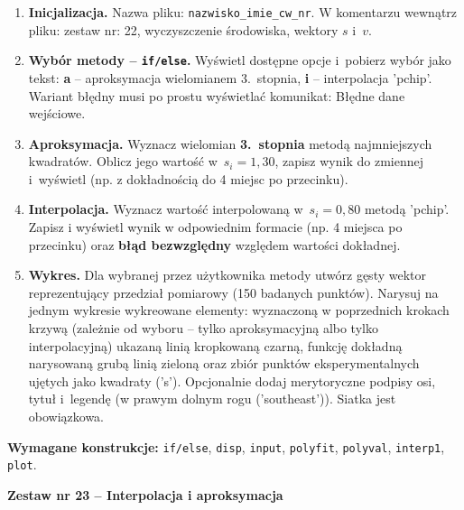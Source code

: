 \documentclass[a4paper,11pt]{article}
\begin{document}
\begin{enumerate}[leftmargin=*, label=\textbf{\arabic*.}, itemsep=2pt]

  \item \textbf{Inicjalizacja.}
    Nazwa pliku: \texttt{nazwisko\_imie\_cw\_nr}. W komentarzu wewnątrz pliku: zestaw nr: 22, wyczyszczenie środowiska, wektory $s$ i~$v$.

  \item \textbf{Wybór metody -- \texttt{if/else}.}
    Wyświetl dostępne opcje i~pobierz wybór jako tekst: \textbf{a} -- aproksymacja wielomianem 3.~stopnia, \textbf{i} -- interpolacja 'pchip'. Wariant błędny musi po prostu wyświetlać komunikat: Błędne dane wejściowe.

  \item \textbf{Aproksymacja.}
    Wyznacz wielomian \textbf{3.~stopnia} metodą najmniejszych kwadratów. Oblicz jego wartość w~$s_i = 1{,}30$, zapisz wynik do zmiennej i~wyświetl (np. z dokładnością do 4 miejsc po przecinku).

  \item \textbf{Interpolacja.}
    Wyznacz wartość interpolowaną w~$s_i = 0{,}80$ metodą 'pchip'. Zapisz i wyświetl wynik w odpowiednim formacie (np. 4 miejsca po przecinku) oraz \textbf{błąd bezwzględny} względem wartości dokładnej.

  \item \textbf{Wykres.}
    Dla wybranej przez użytkownika metody utwórz gęsty wektor reprezentujący przedział pomiarowy (150 badanych punktów). Narysuj na jednym wykresie wykreowane elementy: wyznaczoną w poprzednich krokach krzywą (zależnie od wyboru -- tylko aproksymacyjną albo tylko interpolacyjną) ukazaną linią kropkowaną czarną, funkcję dokładną narysowaną grubą linią zieloną oraz zbiór punktów eksperymentalnych ujętych jako kwadraty ('s'). Opcjonalnie dodaj merytoryczne podpisy osi, tytuł i~legendę (w prawym dolnym rogu ('southeast')). Siatka jest obowiązkowa.

\end{enumerate}

\vspace{0.3cm}
\begin{ramka}
\textbf{Wymagane konstrukcje:}
\texttt{if/else}, \texttt{disp}, \texttt{input}, \texttt{polyfit}, \texttt{polyval}, \texttt{interp1}, \texttt{plot}.
\end{ramka}

\clearpage
\begin{center}
  {\large\bfseries Zestaw nr 23 \quad -- \quad Interpolacja i aproksymacja}
\end{center}
\hrulefill
\vspace{0.4cm}
\end{document}
